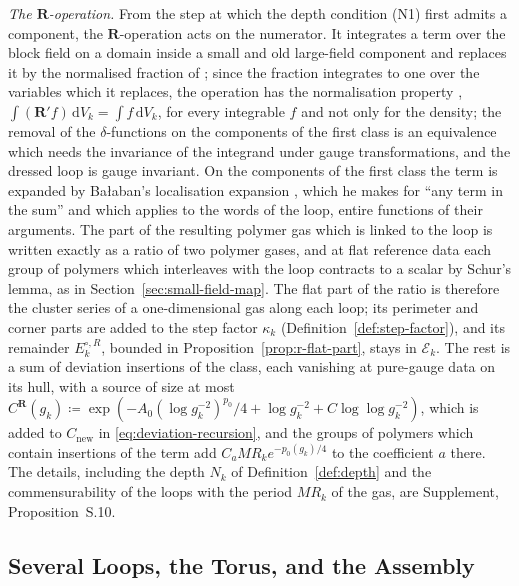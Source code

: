 \documentclass[11pt]{preprint}
\newcommand{\dd}{\mathrm{d}}
\numberwithin{equation}{section}
\theoremstyle{definition}
\theoremstyle{remark}
\theoremstyle{plain}
\begin{document}
\emph{The $\mathbf R$-operation.} From the step at which the depth condition (N1) first admits a component, the $\mathbf R$-operation acts on the numerator. It integrates a term over the block field on a domain inside a small and old large-field component and replaces it by the normalised fraction of \cite[(1.100), p.~201]{BalabanLFR1}; since the fraction integrates to one over the variables which it replaces, the operation has the normalisation property \cite[(1.102), p.~201]{BalabanLFR1}, $\int(\mathbf R'f)\,\dd V_k = \int f\,\dd V_k$, for every integrable $f$ and not only for the density; the removal of the $\delta$-functions on the components of the first class \cite[p.~378]{BalabanLFR2} is an equivalence which needs the invariance of the integrand under gauge transformations, and the dressed loop is gauge invariant. On the components of the first class the term is expanded by Ba{\l}aban's localisation expansion \cite[pp.~372--376, (1.66)--(1.67)]{BalabanLFR2}, which he makes for ``any term in the sum'' and which applies to the words of the loop, entire functions of their arguments. The part of the resulting polymer gas which is linked to the loop is written exactly as a ratio of two polymer gases, and at flat reference data each group of polymers which interleaves with the loop contracts to a scalar by Schur's lemma, as in Section~\ref{sec:small-field-map}. The flat part of the ratio is therefore the cluster series of a one-dimensional gas along each loop; its perimeter and corner parts are added to the step factor $\kappa_k$ (Definition~\ref{def:step-factor}), and its remainder $E^{\circ,R}_k$, bounded in Proposition~\ref{prop:r-flat-part}, stays in $\mathcal E_k$. The rest is a sum of deviation insertions of the class, each vanishing at pure-gauge data on its hull, with a source of size at most $C^{\mathbf R}(g_k) \coloneqq \exp(-A_0(\log g_k^{-2})^{p_0}/4 + \log g_k^{-2} + C\log\log g_k^{-2})$, which is added to $C_{\mathrm{new}}$ in \eqref{eq:deviation-recursion}, and the groups of polymers which contain insertions of the term add $C_aMR_ke^{-p_0(g_k)/4}$ to the coefficient $a$ there. The details, including the depth $N_k$ of Definition~\ref{def:depth} and the commensurability of the loops with the period $MR_k$ of the gas, are Supplement, Proposition~S.10.

\subsection{Several Loops, the Torus, and the Assembly}\label{sec:assembly}
\end{document}
